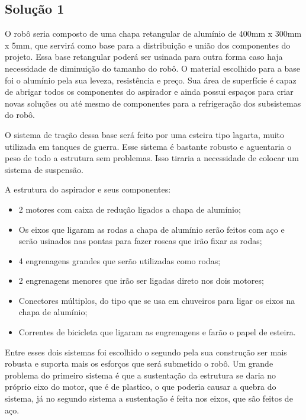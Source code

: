 	\subsection{Solução 1} %
	\label{sub:solução_1}

		O robô seria composto de uma chapa retangular de alumínio de 400mm x 300mm x 5mm, que servirá como base para a distribuição e união dos componentes do projeto. Essa base retangular poderá ser usinada para outra forma caso haja necessidade de diminuição do tamanho do robô. O material escolhido para a base foi o alumínio pela sua leveza, resistência e preço. Sua área  de superfície é capaz de abrigar todos os componentes do aspirador e ainda possui espaços para criar novas soluções ou até mesmo de componentes para a refrigeração dos subsistemas do robô.

		O sistema de tração dessa base será feito por uma esteira tipo lagarta, muito utilizada em tanques de guerra. Esse sistema é bastante robusto e aguentaria o peso de todo a estrutura sem problemas. Isso tiraria a necessidade de colocar um sistema de suspensão.

		A estrutura do aspirador e seus componentes:

		\begin{itemize}
			\item 2 motores com caixa de redução ligados a chapa de alumínio;
			\item Os eixos que ligaram as rodas a chapa de alumínio serão feitos com aço e serão usinados nas pontas para fazer roscas que irão fixar as rodas;
			\item 4 engrenagens grandes que serão utilizadas como rodas;
			\item 2 engrenagens menores que irão ser ligadas direto nos dois motores;
			\item Conectores múltiplos, do tipo que se usa em chuveiros para ligar os eixos na chapa de alumínio;
			\item Correntes de bicicleta que ligaram as engrenagens e farão o papel de esteira.
		\end{itemize}

		Entre esses dois sistemas foi escolhido o segundo pela sua construção ser mais robusta e suporta mais os esforços que será submetido o robô. Um grande problema do primeiro sistema é que a sustentação da estrutura se daria no próprio eixo do motor, que é de plastico, o que poderia causar a quebra do sistema, já no segundo sistema a sustentação é feita nos eixos, que são feitos de aço.
		
